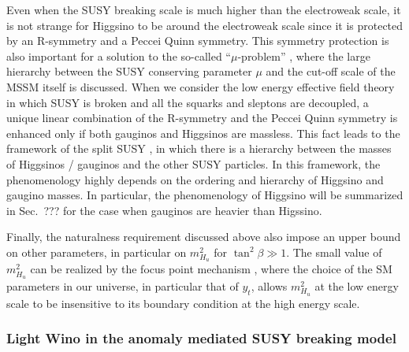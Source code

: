 \documentclass[12pt,twoside,book]{article}
\begin{document}
Even when the SUSY breaking scale is much higher than the electroweak scale, it is not strange for Higgsino to be around the electroweak scale since it is protected by an R-symmetry and a Peccei Quinn symmetry.  
This symmetry protection is also important for a solution to the so-called ``$\mu$-problem'' \cite{Giudice:1988yz}, where the large hierarchy between the SUSY conserving parameter $\mu$ and the cut-off scale of the MSSM itself is discussed.
When we consider the low energy effective field theory in which SUSY is broken and all the squarks and sleptons are decoupled, a unique linear combination of the R-symmetry and the Peccei Quinn symmetry is enhanced only if both gauginos and Higgsinos are massless.
This fact leads to the framework of the split SUSY \cite{Giudice:2004tc}, in which there is a hierarchy between the masses of Higgsinos / gauginos and the other SUSY particles.
In this framework, the phenomenology highly depends on the ordering and hierarchy of Higgsino and gaugino masses.
In particular, the phenomenology of Higgsino will be summarized in Sec.~???  for the case when gauginos are heavier than Higssino.

Finally, the naturalness requirement discussed above also impose an upper bound on other parameters, in particular on $m_{H_u}^2$ for $\tan^2 \beta \gg 1$.
The small value of $m_{H_u}^2$ can be realized by the focus point mechanism \cite{Feng:1999hg, Feng:1999mn, Feng:1999zg}, where the choice of the SM parameters in our universe, in particular that of $y_t$, allows $m_{H_u}^2$ at the low energy scale to be insensitive to its boundary condition at the high energy scale.



\subsubsection*{Light Wino in the anomaly mediated SUSY breaking model}
\end{document}
